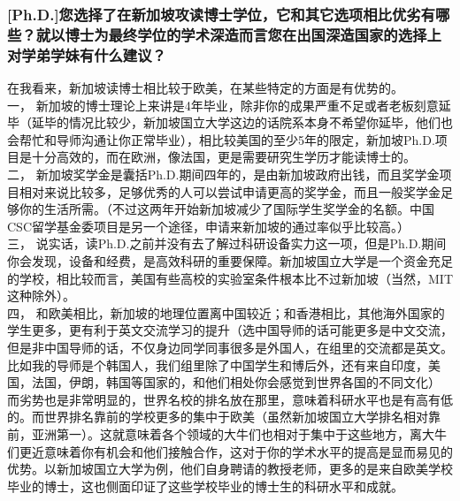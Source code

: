 \documentclass[a4paper,UTF8]{book}
\begin{document}
    \subsubsection*{[Ph.D.]您选择了在新加坡攻读博士学位，它和其它选项相比优劣有哪些？就以博士为最终学位的学术深造而言您在出国深造国家的选择上对学弟学妹有什么建议？}
    在我看来，新加坡读博士相比较于欧美，在某些特定的方面是有优势的。\\
    一， 新加坡的博士理论上来讲是4年毕业，除非你的成果严重不足或者老板刻意延毕（延毕的情况比较少，新加坡国立大学这边的话院系本身不希望你延毕，他们也会帮忙和导师沟通让你正常毕业），相比较美国的至少5年的限定，新加坡Ph.D.项目是十分高效的，而在欧洲，像法国，更是需要研究生学历才能读博士的。\\
    二， 新加坡奖学金是囊括Ph.D.期间四年的，是由新加坡政府出钱，而且奖学金项目相对来说比较多，足够优秀的人可以尝试申请更高的奖学金，而且一般奖学金足够你的生活所需。（不过这两年开始新加坡减少了国际学生奖学金的名额。中国CSC留学基金委项目是另一个途径，申请来新加坡的通过率似乎比较高。）\\
    三， 说实话，读Ph.D.之前并没有去了解过科研设备实力这一项，但是Ph.D.期间你会发现，设备和经费，是高效科研的重要保障。新加坡国立大学是一个资金充足的学校，相比较而言，美国有些高校的实验室条件根本比不过新加坡（当然，MIT这种除外）。\\
    四， 和欧美相比，新加坡的地理位置离中国较近；和香港相比，其他海外国家的学生更多，更有利于英文交流学习的提升（选中国导师的话可能更多是中文交流，但是非中国导师的话，不仅身边同学同事很多是外国人，在组里的交流都是英文。比如我的导师是个韩国人，我们组里除了中国学生和博后外，还有来自印度，美国，法国，伊朗，韩国等国家的，和他们相处你会感觉到世界各国的不同文化）\\
    而劣势也是非常明显的，世界名校的排名放在那里，意味着科研水平也是有高有低的。而世界排名靠前的学校更多的集中于欧美（虽然新加坡国立大学排名相对靠前，亚洲第一）。这就意味着各个领域的大牛们也相对于集中于这些地方，离大牛们更近意味着你有机会和他们接触合作，这对于你的学术水平的提高是显而易见的优势。以新加坡国立大学为例，他们自身聘请的教授老师，更多的是来自欧美学校毕业的博士，这也侧面印证了这些学校毕业的博士生的科研水平和成就。
\end{document}
